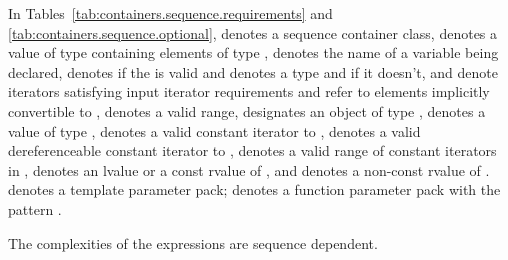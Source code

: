 \pnum
In Tables~\ref{tab:containers.sequence.requirements}
and \ref{tab:containers.sequence.optional},
 denotes a sequence container class,
 denotes a value of type  containing elements of type ,
 denotes the name of a variable being declared,
 denotes  if
the   is valid and denotes a
type and
 if it doesn't,
 and 
denote iterators satisfying input iterator requirements
and refer to elements implicitly convertible to ,
\tcode{[i, j)}
denotes a valid range,
 designates an object of type ,
denotes a value of type ,
 denotes a valid constant iterator to
, 
denotes a valid dereferenceable constant iterator to
, \tcode{[q1, q2)}
denotes a valid range of constant iterators in
, 
denotes an lvalue or a const rvalue of
, and  denotes
a non-const rvalue of .
 denotes a template parameter pack;
 denotes a function parameter pack with the pattern .

\pnum
The complexities of the expressions are sequence dependent.

